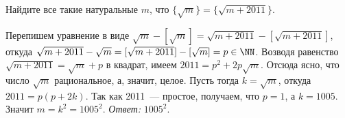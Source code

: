 Найдите все такие натуральные $m$, что
$\{ \sqrt{m} \} = \{ \sqrt{m+2011} \}$.

\solution
Перепишем уравнение в виде
$\sqrt{m} - [\sqrt{m}] = \sqrt{m + 2011} - [\sqrt{m + 2011}]$,
откуда
\(
    \sqrt{m + 2011} - \sqrt{m}
=
    [\sqrt{m + 2011}] - [\sqrt{m}]
=
    p \in \NN
\).
Возводя равенство $\sqrt{m + 2011} = \sqrt{m} + p$ в квадрат, имеем
$2011 = p^2 + 2 p \sqrt{m}$.
Отсюда ясно, что число $\sqrt{m}$ рациональное, а, значит, целое.
Пусть тогда $k = \sqrt{m}$, откуда $2011 = p (p + 2 k)$.
Так как 2011~--- простое, получаем, что $p=1$, а $k = 1005$.
Значит $m = k^2 = 1005^2$.
\emph{Ответ:} $1005^2$.

